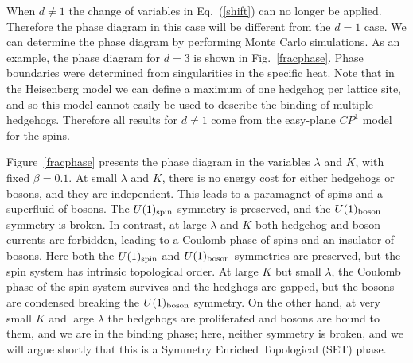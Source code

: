 When $d\neq1$ the change of variables in Eq.~(\ref{shift}) can no longer be applied. Therefore the phase diagram in this case will be different from the $d=1$ case. We can determine the phase diagram by performing Monte Carlo simulations. As an example, the phase diagram for $d=3$ is shown in Fig.~\ref{fracphase}. Phase boundaries were determined from singularities in the specific heat. Note that in the Heisenberg model we can define a maximum of one hedgehog per lattice site, and so this model cannot easily be used to describe the binding of  multiple hedgehogs. Therefore all results for $d \neq 1$ come from the easy-plane $CP^1$ model for the spins. 

Figure~\ref{fracphase} presents the phase diagram in the variables $\lambda$ and $K$, with fixed $\beta=0.1$.
At small $\lambda$ and $K$, there is no energy cost for either hedgehogs or bosons, and they are independent. This leads to a paramagnet of spins and a superfluid of bosons. The $U(1)_{\rm spin}$ symmetry is preserved, and the $U(1)_{\rm boson}$ symmetry is broken. In contrast, at large $\lambda$ and $K$ both hedgehog and boson currents are forbidden, leading to a Coulomb phase of spins and an insulator of bosons. Here both the $U(1)_{\rm spin}$ and $U(1)_{\rm boson}$ symmetries are preserved, but the spin system has intrinsic topological order. 
At large $K$ but small $\lambda$, the Coulomb phase of the spin system survives and the hedghogs are gapped, but the bosons are condensed breaking the $U(1)_{\rm boson}$ symmetry.
On the other hand, at very small $K$ and large $\lambda$ the hedgehogs are proliferated and bosons are bound to them, and we are in the binding phase; here, neither symmetry is broken, and we will argue shortly that this is a Symmetry Enriched Topological (SET) phase. 

